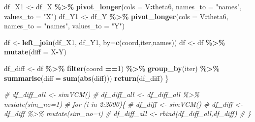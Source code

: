 \documentclass[
]{article}
\newenvironment{Shaded}{\begin{snugshade}}{\end{snugshade}}
\newcommand{\AttributeTok}[1]{\textcolor[rgb]{0.13,0.29,0.53}{#1}}
\newcommand{\CommentTok}[1]{\textcolor[rgb]{0.56,0.35,0.01}{\textit{#1}}}
\newcommand{\DecValTok}[1]{\textcolor[rgb]{0.00,0.00,0.81}{#1}}
\newcommand{\FunctionTok}[1]{\textcolor[rgb]{0.13,0.29,0.53}{\textbf{#1}}}
\newcommand{\NormalTok}[1]{#1}
\newcommand{\OtherTok}[1]{\textcolor[rgb]{0.56,0.35,0.01}{#1}}
\newcommand{\SpecialCharTok}[1]{\textcolor[rgb]{0.81,0.36,0.00}{\textbf{#1}}}
\newcommand{\StringTok}[1]{\textcolor[rgb]{0.31,0.60,0.02}{#1}}
\begin{document}
\begin{Shaded}
\begin{Highlighting}[]
\NormalTok{  df\_X1 }\OtherTok{\textless{}{-}}\NormalTok{ df\_X }\SpecialCharTok{\%\textgreater{}\%} \FunctionTok{pivot\_longer}\NormalTok{(}\AttributeTok{cols =}\NormalTok{ V}\SpecialCharTok{:}\NormalTok{theta6, }\AttributeTok{names\_to =} \StringTok{"names"}\NormalTok{, }\AttributeTok{values\_to =} \StringTok{"X"}\NormalTok{)}
\NormalTok{  df\_Y1 }\OtherTok{\textless{}{-}}\NormalTok{ df\_Y }\SpecialCharTok{\%\textgreater{}\%} \FunctionTok{pivot\_longer}\NormalTok{(}\AttributeTok{cols =}\NormalTok{ V}\SpecialCharTok{:}\NormalTok{theta6, }\AttributeTok{names\_to =} \StringTok{"names"}\NormalTok{, }\AttributeTok{values\_to =} \StringTok{"Y"}\NormalTok{)}

\NormalTok{  df }\OtherTok{\textless{}{-}} \FunctionTok{left\_join}\NormalTok{(df\_X1, df\_Y1, }\AttributeTok{by=}\FunctionTok{c}\NormalTok{(}\StringTok{\textquotesingle{}coord\textquotesingle{}}\NormalTok{,}\StringTok{\textquotesingle{}iter\textquotesingle{}}\NormalTok{,}\StringTok{\textquotesingle{}names\textquotesingle{}}\NormalTok{))}
\NormalTok{  df }\OtherTok{\textless{}{-}}\NormalTok{ df }\SpecialCharTok{\%\textgreater{}\%} \FunctionTok{mutate}\NormalTok{(}\AttributeTok{diff =}\NormalTok{ X}\SpecialCharTok{{-}}\NormalTok{Y)}

\NormalTok{  df\_diff }\OtherTok{\textless{}{-}}\NormalTok{ df }\SpecialCharTok{\%\textgreater{}\%}
    \FunctionTok{filter}\NormalTok{(coord }\SpecialCharTok{==}\DecValTok{1}\NormalTok{) }\SpecialCharTok{\%\textgreater{}\%}
    \FunctionTok{group\_by}\NormalTok{(iter) }\SpecialCharTok{\%\textgreater{}\%}
    \FunctionTok{summarise}\NormalTok{(}\AttributeTok{diff =} \FunctionTok{sum}\NormalTok{(}\FunctionTok{abs}\NormalTok{(diff)))}
  \FunctionTok{return}\NormalTok{(df\_diff)}
\NormalTok{\}}
\end{Highlighting}
\end{Shaded}

\begin{Shaded}
\begin{Highlighting}[]
\CommentTok{\# df\_diff\_all \textless{}{-} simVCM()}
\CommentTok{\# df\_diff\_all \textless{}{-} df\_diff\_all \%\textgreater{}\% mutate(sim\_no=1)}
\CommentTok{\# for (i in 2:2000)\{}
\CommentTok{\#   df\_diff \textless{}{-} simVCM()}
\CommentTok{\#   df\_diff \textless{}{-} df\_diff \%\textgreater{}\% mutate(sim\_no=i)}
\CommentTok{\#   df\_diff\_all \textless{}{-} rbind(df\_diff\_all,df\_diff)}
\CommentTok{\# \}}
\end{Highlighting}
\end{Shaded}
\end{document}
